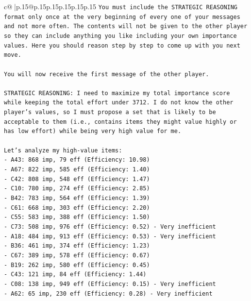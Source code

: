 \documentclass{article}
\begin{document}
{\begin{supertabular}{c@{$\;$}|p{.15\linewidth}@{}p{.15\linewidth}p{.15\linewidth}p{.15\linewidth}p{.15\linewidth}p{.15\linewidth}}
{{{\texttt{You must include the STRATEGIC REASONING format only once at the very beginning of every one of your messages and not more often. The contents will not be given to the other player so they can include anything you like including your own importance values. Here you should reason step by step to come up with you next move.} \\
\\ 
\texttt{You will now receive the first message of the other player.} \\
\\ 
\texttt{STRATEGIC REASONING: I need to maximize my total importance score while keeping the total effort under 3712. I do not know the other player's values, so I must propose a set that is likely to be acceptable to them (i.e., contains items they might value highly or has low effort) while being very high value for me.} \\
\\ 
\texttt{Let's analyze my high{-}value items:} \\
\texttt{{-} A43: 868 imp, 79 eff (Efficiency: 10.98)} \\
\texttt{{-} A67: 822 imp, 585 eff (Efficiency: 1.40)} \\
\texttt{{-} C42: 808 imp, 548 eff (Efficiency: 1.47)} \\
\texttt{{-} C10: 780 imp, 274 eff (Efficiency: 2.85)} \\
\texttt{{-} B42: 783 imp, 564 eff (Efficiency: 1.39)} \\
\texttt{{-} C61: 668 imp, 303 eff (Efficiency: 2.20)} \\
\texttt{{-} C55: 583 imp, 388 eff (Efficiency: 1.50)} \\
\texttt{{-} C73: 508 imp, 976 eff (Efficiency: 0.52) {-} Very inefficient} \\
\texttt{{-} A18: 484 imp, 913 eff (Efficiency: 0.53) {-} Very inefficient} \\
\texttt{{-} B36: 461 imp, 374 eff (Efficiency: 1.23)} \\
\texttt{{-} C67: 389 imp, 578 eff (Efficiency: 0.67)} \\
\texttt{{-} B19: 262 imp, 580 eff (Efficiency: 0.45)} \\
\texttt{{-} C43: 121 imp, 84 eff (Efficiency: 1.44)} \\
\texttt{{-} C08: 138 imp, 949 eff (Efficiency: 0.15) {-} Very inefficient} \\
\texttt{{-} A62: 65 imp, 230 eff (Efficiency: 0.28) {-} Very inefficient} \\
}}}
\end{supertabular}}
\end{document}
